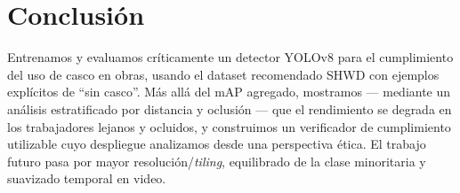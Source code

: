 \documentclass{article}
\begin{document}
\section{Conclusión}
Entrenamos y evaluamos críticamente un detector YOLOv8 para el cumplimiento del uso
de casco en obras, usando el dataset recomendado SHWD con ejemplos explícitos de
``sin casco''. Más allá del mAP agregado, mostramos --- mediante un análisis
estratificado por distancia y oclusión --- que el rendimiento se degrada en los
trabajadores lejanos y ocluidos, y construimos un verificador de cumplimiento
utilizable cuyo despliegue analizamos desde una perspectiva ética. El trabajo
futuro pasa por mayor resolución/\emph{tiling}, equilibrado de la clase minoritaria
y suavizado temporal en video.

\small


\end{document}
